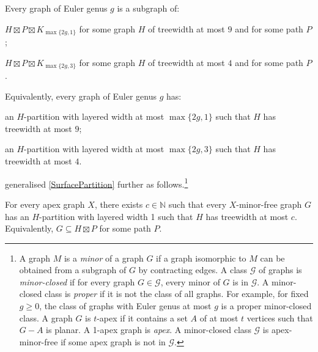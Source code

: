\documentclass{patmorin}
\renewcommand{\geq}{\geqslant}
\begin{document}
\begin{thm}
\label{SurfacePartition}
Every graph of Euler genus $g$ is a subgraph of:
\begin{compactenum}[(a)]
\item  $H \boxtimes P \boxtimes K_{\max\{2g,1\}}$ for some graph $H$ of treewidth at most $9$ and for some path $P$;
\item  $H \boxtimes P \boxtimes K_{\max\{2g,3\}}$ for some graph $H$ of treewidth at most $4$ and for some path $P$.
\end{compactenum}
Equivalently, every graph of Euler genus $g$ has:
\begin{compactenum}[(a)]
\item an $H$-partition with layered width at most $\max\{2g,1\}$ such that $H$ has treewidth at most $9$;
\item an $H$-partition with layered width at most $\max\{2g,3\}$ such that $H$ has treewidth at most $4$.
\end{compactenum}
\end{thm}

\citet{dujmovic.joret.ea:planar} generalised \cref{SurfacePartition} further as follows.\footnote{A graph $M$ is a \textit{minor} of a graph $G$ if a graph isomorphic to $M$ can be obtained from a subgraph of $G$ by contracting edges. A class $\mathcal{G}$ of graphs is \emph{minor-closed} if for every graph $G\in\mathcal{G}$, every minor of $G$ is in $\mathcal{G}$. A minor-closed class is \emph{proper} if it is not the class of all graphs. For example, for fixed $g\geq 0$, the class of graphs with Euler genus at most $g$ is a proper minor-closed class. A graph $G$ is $t$-apex if it contains a set $A$ of at most $t$ vertices such that $G-A$ is planar. A 1-apex graph is \emph{apex}.  A minor-closed class $\mathcal{G}$ is apex-minor-free if some apex graph is not in $\mathcal{G}$.}

\begin{thm} 
\label{ApexMinorFree}
For every apex graph $X$, there exists $c\in\mathbb{N}$ such that every $X$-minor-free graph $G$ has
an $H$-partition with layered width 1 such that $H$ has treewidth at most $c$. Equivalently, $G\subseteq H\boxtimes P$ for some path $P$. 
\end{thm}
\end{document}
